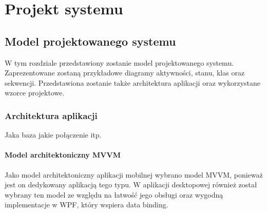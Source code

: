 \documentclass[12pt,oneside]{report}
\begin{document}
\chapter{Projekt systemu}
\section{Model projektowanego systemu}
W tym rozdziale przedstawiony zostanie model projektowanego systemu. Zaprezentowane zostaną przykładowe diagramy aktywności, stanu, klas oraz sekwencji. Przedstawiona zostanie także architektura aplikacji oraz wykorzystane wzorce projektowe.

\subsection{Architektura aplikacji}
Jaka baza jakie połączenie itp.
\subsubsection{Model architektoniczny MVVM}
Jako model architektoniczny aplikacji mobilnej wybrano model MVVM, ponieważ jest on dedykowany aplikacją tego typu. W aplikacji desktopowej również został wybrany ten model ze względu na łatwość jego obsługi oraz wygodną implementacje w WPF, który wspiera data binding.
 
\end{document}

